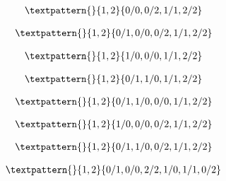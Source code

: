 \begin{equation}
	\begin{gathered}
		\textpattern{}{1,2}{0/0,0/2,1/1,2/2}
	\end{gathered}
	\label{cls:94}
\end{equation}

\begin{equation}
	\begin{gathered}
		\textpattern{}{1,2}{0/1,0/0,0/2,1/1,2/2}
	\end{gathered}
	\label{cls:95}
\end{equation}

\begin{equation}
	\begin{gathered}
		\textpattern{}{1,2}{1/0,0/0,1/1,2/2}
	\end{gathered}
	\label{cls:96}
\end{equation}

\begin{equation}
	\begin{gathered}
		\textpattern{}{1,2}{0/1,1/0,1/1,2/2}
	\end{gathered}
	\label{cls:97}
\end{equation}

\begin{equation}
	\begin{gathered}
		\textpattern{}{1,2}{0/1,1/0,0/0,1/1,2/2}
	\end{gathered}
	\label{cls:98}
\end{equation}

\begin{equation}
	\begin{gathered}
		\textpattern{}{1,2}{1/0,0/0,0/2,1/1,2/2}
	\end{gathered}
	\label{cls:99}
\end{equation}

\begin{equation}
	\begin{gathered}
		\textpattern{}{1,2}{0/1,1/0,0/2,1/1,2/2}
	\end{gathered}
	\label{cls:100}
\end{equation}

\begin{equation}
	\begin{gathered}
		\textpattern{}{1,2}{0/1,0/0,2/2,1/0,1/1,0/2}
	\end{gathered}
	\label{cls:101}
\end{equation}

